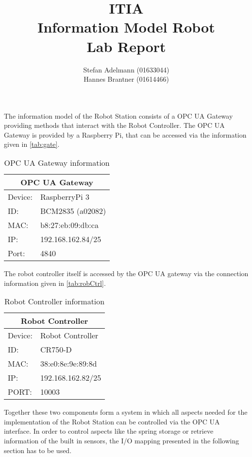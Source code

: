 \documentclass{article}
\title{ITIA\\Information Model Robot\\Lab Report}
\author{Stefan Adelmann (01633044)\\Hannes Brantner (01614466)}
\begin{document}
\maketitle{}
The information model of the Robot Station consists of a OPC UA Gateway providing methods that interact with the Robot Controller. 
The OPC UA Gateway is provided by a Raspberry Pi, that can be accessed via the information given in \autoref{tab:gate}.
\begin{table}[H]
	\centering
	\setlength\extrarowheight{2pt}
	\begin{tabular}[h]{|p{1.2cm}p{4.5cm}|}
		\hline
		\multicolumn{2}{|c|}{\bf OPC UA Gateway}\\
		\hline\hline
		Device: & RaspberryPi 3\\
		\hline
		ID: & BCM2835 (a02082)\\
		\hline
		MAC: & b8:27:eb:09:db:ca\\
		\hline
		IP: & 192.168.162.84/25\\
		\hline
		Port: & 4840\\
		\hline
	\end{tabular} 
	\caption{OPC UA Gateway information}
	\label{tab:gate}
\end{table}
The robot controller itself is accessed by the OPC UA gateway via the connection information given in \autoref{tab:robCtrl}.
\begin{table}[H]
	\centering
	\setlength\extrarowheight{2pt}
	\begin{tabular}[h]{|p{1.2cm}p{4.5cm}|}
		\hline
		\multicolumn{2}{|c|}{\bf Robot Controller}\\
		\hline\hline
		Device: & Robot Controller\\
		\hline
		ID: & CR750-D\\
		\hline
		MAC: & 38:e0:8e:9e:89:8d\\
		\hline
		IP: & 192.168.162.82/25\\
		\hline
		PORT: & 10003\\
		\hline
	\end{tabular} 
	\caption{Robot Controller information}
	\label{tab:robCtrl}
\end{table}
Together these two components form a system in which all aspects needed for the implementation of the Robot Station can be controlled via the OPC UA interface. In order to control aspects like the spring storage or retrieve information of the built in sensors, the I/O mapping presented in the following section has to be used.
\newpage
\end{document}
